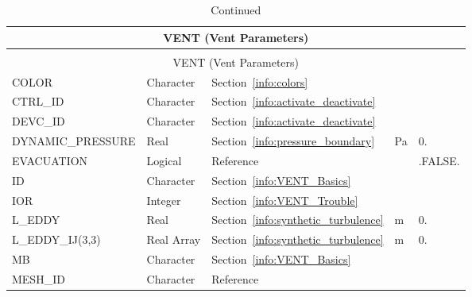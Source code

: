 \documentclass[11pt]{book}
\begin{document}
\begin{longtable}{@{\extracolsep{\fill}}|l|l|l|l|l|}
\caption[Vent parameters ({\ct VENT} namelist group)]{For more information see Section~\ref{info:VENT}.}
\label{tbl:VENT} \\
\hline
\multicolumn{5}{|c|}{{\ct VENT} (Vent Parameters)} \\
\hline \hline
\endfirsthead
\caption[]{Continued} \\
\hline
\multicolumn{5}{|c|}{{\ct VENT} (Vent Parameters)} \\
\hline \hline
\endhead
{\ct COLOR    }             & Character         & Section~\ref{info:colors}                                 &               &                     \\ \hline
{\ct CTRL\_ID }             & Character         & Section~\ref{info:activate_deactivate}                    &               &                     \\ \hline
{\ct DEVC\_ID }             & Character         & Section~\ref{info:activate_deactivate}                    &               &                     \\ \hline
{\ct DYNAMIC\_PRESSURE}     & Real              & Section~\ref{info:pressure_boundary}                      & Pa            & 0.                  \\ \hline
{\ct EVACUATION    }        & Logical           & Reference~\cite{FDS_Evac_Users_Guide}                     &               &  {\ct .FALSE.}      \\ \hline
{\ct ID }                   & Character         & Section~\ref{info:VENT_Basics}                            &               &                     \\ \hline
{\ct IOR}                   & Integer           & Section~\ref{info:VENT_Trouble}                           &               &                     \\ \hline
{\ct L\_EDDY}               & Real              & Section~\ref{info:synthetic_turbulence}                   & m             & 0.                  \\ \hline
{\ct L\_EDDY\_IJ(3,3)}      & Real Array        & Section~\ref{info:synthetic_turbulence}                   & m             & 0.                  \\ \hline
{\ct MB    }                & Character         & Section~\ref{info:VENT_Basics}                            &               &                     \\ \hline
{\ct MESH\_ID    }          & Character         & Reference~\cite{FDS_Evac_Users_Guide}                     &               &                     \\ \hline

\end{longtable}
\end{document}
